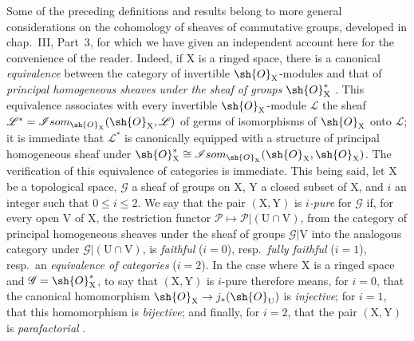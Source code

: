 \begin{remark}[21.13.13]
\label{IV.21.13.13}
Some of the preceding definitions and results belong to more general considerations on the cohomology of sheaves of commutative groups, developed in chap.~III, Part~3, for which we have given an independent account here for the convenience of the reader.
Indeed, if $\mathrm{X}$ is a ringed space, there is a canonical \emph{equivalence} between the category of invertible $\sh{O}_{\mathrm{X}}$-modules and that of \emph{principal homogeneous sheaves under the sheaf of groups} $\sh{O}_{\mathrm{X}}^*$ .
This equivalence associates with every invertible $\sh{O}_{\mathrm{X}}$-module $\mathscr{L}$ the sheaf $\mathscr{L}^*=\mathscr{I}som_{\sh{O}_{\mathrm{X}}}(\sh{O}_{\mathrm{X}},\mathscr{L})$ of germs of isomorphisms of $\sh{O}_{\mathrm{X}}$ onto $\mathscr{L}$; it is immediate that $\mathscr{L}^*$ is canonically equipped with a structure of principal homogeneous sheaf under $\sh{O}_{\mathrm{X}}^*\cong\mathscr{I}som_{\sh{O}_{\mathrm{X}}}(\sh{O}_{\mathrm{X}},\sh{O}_{\mathrm{X}})$.
The verification of this equivalence of categories is immediate.
This being said, let $\mathrm{X}$ be a topological space, $\mathscr{G}$ a sheaf of groups on $\mathrm{X}$, $\mathrm{Y}$ a closed subset of $\mathrm{X}$, and $i$ an integer such that $0\leq i\leq 2$. We say that the pair $(\mathrm{X},\mathrm{Y})$ is \emph{$i$-pure} for $\mathscr{G}$ if, for every open $\mathrm{V}$ of $\mathrm{X}$, the restriction functor $\mathscr{P}\mapsto\mathscr{P}|(\mathrm{U}\cap\mathrm{V})$, from the category of principal homogeneous sheaves under the sheaf of groups $\mathscr{G}|\mathrm{V}$ into the analogous category under $\mathscr{G}|(\mathrm{U}\cap\mathrm{V})$, is \emph{faithful} ($i=0$), resp.\ \emph{fully faithful} ($i=1$), resp.\ an \emph{equivalence of categories} ($i=2$).
In the case where $\mathrm{X}$ is a ringed space and $\mathscr{G}=\sh{O}_{\mathrm{X}}^*$, to say that $(\mathrm{X},\mathrm{Y})$ is $i$-pure therefore means, for $i=0$, that the canonical homomorphism $\sh{O}_{\mathrm{X}}\to j_*(\sh{O}_{\mathrm{U}})$ is \emph{injective}; for $i=1$, that this homomorphism is \emph{bijective}; and finally, for $i=2$, that the pair $(\mathrm{X},\mathrm{Y})$ is \emph{parafactorial} .


\end{remark}
